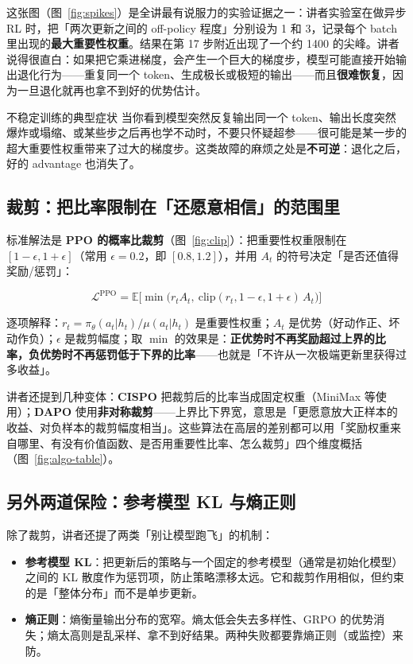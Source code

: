 \documentclass[a4paper]{article}
\begin{document}
这张图（图~\ref{fig:spikes}）是全讲最有说服力的实验证据之一：讲者实验室在做异步 RL 时，把「两次更新之间的 off-policy 程度」分别设为 1 和 3，记录每个 batch 里出现的\textbf{最大重要性权重}。结果在第 17 步附近出现了一个约 1400 的尖峰。讲者说得很直白：如果把它乘进梯度，会产生一个巨大的梯度步，模型可能直接开始输出退化行为——重复同一个 token、生成极长或极短的输出——而且\textbf{很难恢复}，因为一旦退化就再也拿不到好的优势估计。

\begin{warningbox}{不稳定训练的典型症状}
当你看到模型突然反复输出同一个 token、输出长度突然爆炸或塌缩、或某些步之后再也学不动时，不要只怀疑超参——很可能是某一步的超大重要性权重带来了过大的梯度步。这类故障的麻烦之处是\textbf{不可逆}：退化之后，好的 advantage 也消失了。
\end{warningbox}

\subsection{裁剪：把比率限制在「还愿意相信」的范围里}

标准解法是 \textbf{PPO 的概率比裁剪}（图~\ref{fig:clip}）：把重要性权重限制在 $[1-\epsilon, 1+\epsilon]$（常用 $\epsilon=0.2$，即 $[0.8,1.2]$），并用 $A_t$ 的符号决定「是否还值得奖励/惩罚」：

$$\mathcal{L}^{\text{PPO}} = \mathbb{E}\Big[\min\big(r_t A_t,\ \text{clip}(r_t, 1-\epsilon, 1+\epsilon)\,A_t\big)\Big]$$

逐项解释：$r_t=\pi_\theta(a_t|h_t)/\mu(a_t|h_t)$ 是重要性权重；$A_t$ 是优势（好动作正、坏动作负）；$\epsilon$ 是裁剪幅度；取 $\min$ 的效果是：\textbf{正优势时不再奖励超过上界的比率，负优势时不再惩罚低于下界的比率}——也就是「不许从一次极端更新里获得过多收益」。

讲者还提到几种变体：\textbf{CISPO} 把裁剪后的比率当成固定权重（MiniMax 等使用）；\textbf{DAPO} 使用\textbf{非对称裁剪}——上界比下界宽，意思是「更愿意放大正样本的收益、对负样本的裁剪幅度相当」。这些算法在高层的差别都可以用「奖励权重来自哪里、有没有价值函数、是否用重要性比率、怎么裁剪」四个维度概括（图~\ref{fig:algo-table}）。

\subsection{另外两道保险：参考模型 KL 与熵正则}

除了裁剪，讲者还提了两类「别让模型跑飞」的机制：

\begin{itemize}
\item \textbf{参考模型 KL}：把更新后的策略与一个固定的参考模型（通常是初始化模型）之间的 KL 散度作为惩罚项，防止策略漂移太远。它和裁剪作用相似，但约束的是「整体分布」而不是单步更新。
\item \textbf{熵正则}：熵衡量输出分布的宽窄。熵太低会失去多样性、GRPO 的优势消失；熵太高则是乱采样、拿不到好结果。两种失败都要靠熵正则（或监控）来防。
\end{itemize}
\end{document}
